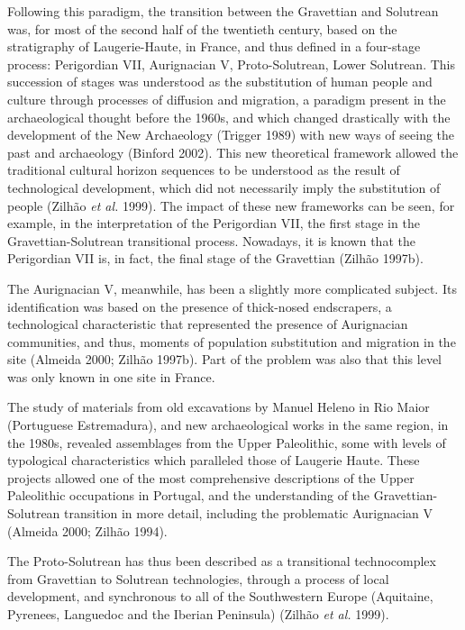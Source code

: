 \documentclass[12pt,twoside]{reedthesis}
\begin{document}
Following this paradigm, the transition between the Gravettian and Solutrean was, for most of the second half of the twentieth century, based on the stratigraphy of Laugerie-Haute, in France, and thus defined in a four-stage process: Perigordian VII, Aurignacian V, Proto-Solutrean, Lower Solutrean. This succession of stages was understood as the substitution of human people and culture through processes of diffusion and migration, a paradigm present in the archaeological thought before the 1960s, and which changed drastically with the development of the New Archaeology (Trigger 1989) with new ways of seeing the past and archaeology (Binford 2002). This new theoretical framework allowed the traditional cultural horizon sequences to be understood as the result of technological development, which did not necessarily imply the substitution of people (Zilhão \emph{et al.} 1999). The impact of these new frameworks can be seen, for example, in the interpretation of the Perigordian VII, the first stage in the Gravettian-Solutrean transitional process. Nowadays, it is known that the Perigordian VII is, in fact, the final stage of the Gravettian (Zilhão 1997b).

The Aurignacian V, meanwhile, has been a slightly more complicated subject. Its identification was based on the presence of thick-nosed endscrapers, a technological characteristic that represented the presence of Aurignacian communities, and thus, moments of population substitution and migration in the site (Almeida 2000; Zilhão 1997b). Part of the problem was also that this level was only known in one site in France.

The study of materials from old excavations by Manuel Heleno in Rio Maior (Portuguese Estremadura), and new archaeological works in the same region, in the 1980s, revealed assemblages from the Upper Paleolithic, some with levels of typological characteristics which paralleled those of Laugerie Haute. These projects allowed one of the most comprehensive descriptions of the Upper Paleolithic occupations in Portugal, and the understanding of the Gravettian-Solutrean transition in more detail, including the problematic Aurignacian V (Almeida 2000; Zilhão 1994).

The Proto-Solutrean has thus been described as a transitional technocomplex from Gravettian to Solutrean technologies, through a process of local development, and synchronous to all of the Southwestern Europe (Aquitaine, Pyrenees, Languedoc and the Iberian Peninsula) (Zilhão \emph{et al.} 1999).
\end{document}
